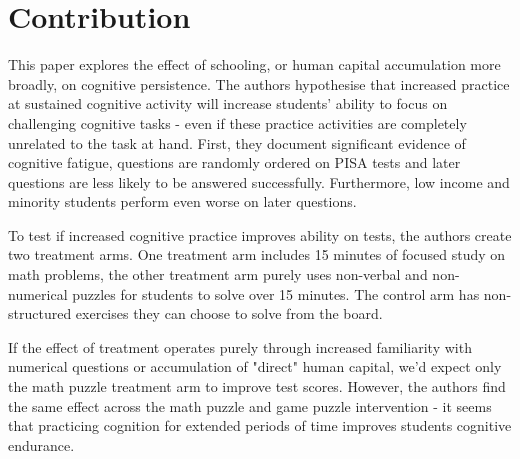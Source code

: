 \documentclass{article}
\author{Edward Jee}
\begin{document}
\section{Contribution}





This paper explores the effect of schooling, or human capital accumulation more 
broadly, on cognitive persistence. The authors hypothesise that increased practice 
at sustained cognitive activity will increase students' ability to focus on 
challenging cognitive tasks - even if these practice activities are completely unrelated 
to the task at hand. First, they document significant evidence of cognitive fatigue,
questions are randomly ordered on PISA tests and later questions are less likely 
to be answered successfully. Furthermore, low income and minority students perform 
even worse on later questions.


To test if increased cognitive practice improves ability on tests, the authors 
create two treatment arms. One treatment arm includes 15 minutes of focused study on math 
problems, the other treatment arm purely uses non-verbal and non-numerical 
puzzles for students to solve over 15 minutes. The control arm has non-structured 
exercises they can choose to solve from the board.


If the effect of treatment operates purely through increased familiarity with 
numerical questions or accumulation of "direct" human capital, we'd expect only 
the math puzzle treatment arm to improve test scores. However, the authors find the 
same effect across the math puzzle and game puzzle intervention - it seems that 
practicing cognition for extended periods of time improves students cognitive 
endurance.



    
\end{document}
